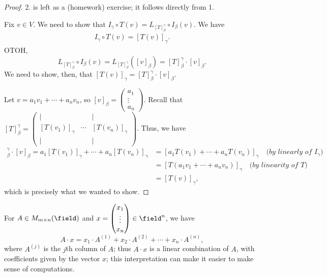 \begin{proof}
    2. is left as a (homework) exercise; it follows directly from 1.

    Fix $v \in V$. We need to show that $I_\gamma \circ T(v) = L_{[T]_\beta^\gamma} \circ I_\beta(v)$. We have \begin{align*}
        I_\gamma \circ T(v) = [T(v)]_\gamma.
    \end{align*}
    OTOH, \[
    L_{[T]_\beta^\gamma} \circ I_\beta (v) = L_{[T]_\beta^\gamma} ([v]_\beta) = [T]_\beta^\gamma \cdot [v]_\beta.
    \]
    We need to show, then, that $[T(v)]_\gamma = [T]_\beta^\gamma \cdot [v]_\beta$.

    Let $v = a_1 v_1 + \cdots + a_n v_n$, so $[v]_\beta = \begin{pmatrix}
        a_1\\
        \vdots\\
        a_n
    \end{pmatrix}$. Recall that $[T]_\beta^\gamma = \begin{pmatrix}
        \vert &  & \vert\\
        [T(v_1)]_\gamma & \cdots & [T(v_n)]_\gamma\\
        \vert &  & \vert
    \end{pmatrix}$. Thus, we have \begin{align*}
        [T]_\beta^\gamma \cdot [v]_\beta = a_1 [T(v_1)]_\gamma + \cdots + a_n [T(v_n)]_\gamma &= [a_1T(v_1) + \cdots + a_n T(v_n)]_\gamma \quad \textit{(by linearly of } I_\gamma\textit{)}\\
        &= [T(a_1 v_1 + \cdots + a_n v_n)]_\gamma \quad \textit{(by linearity of }T\textit{)}\\
        &= [T(v)]_\gamma,
    \end{align*}
    which is precisely what we wanted to show.
\end{proof}

\begin{remark}
    For $A \in M_{m \times n}(\field)$ and $x = \begin{pmatrix}
        x_1\\
        \vdots\\
        x_n
    \end{pmatrix} \in \field^n$, we have \[
    A \cdot x = x_1 \cdot A^{(1)} + x_2 \cdot A^{(2)} + \cdots + x_n \cdot A^{(n)},    
    \]
    where $A^{(j)}$ is the $j$th column of $A$; thus $A \cdot x$ is a linear combination of $A$, with coefficients given by the vector $x$; this interpretation can make it easier to make sense of computations.
\end{remark}